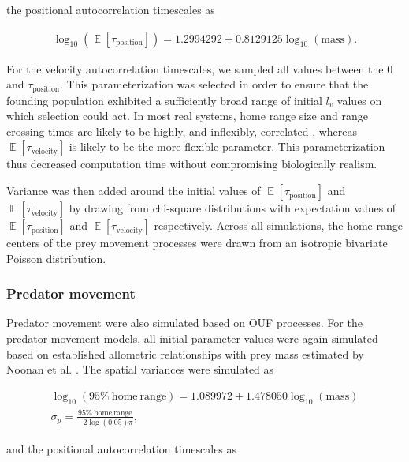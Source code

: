 \documentclass[12pt]{article}
\DeclareMathOperator{\E}{\mathbb{E}}
\begin{document}
the positional autocorrelation timescales as

\begin{gather}
\log_{10}(\E[\tau_\mathrm{position}]) = 1.2994292 + 0.8129125 \log_{10}(\mathrm{mass}).
\end{gather}

For the velocity autocorrelation timescales, we sampled all values between the 0 and $\tau_\mathrm{position}$. This parameterization was selected in order to ensure that the founding population exhibited a sufficiently broad range of initial $l_v$ values on which selection could act. In most real systems, home range size and range crossing times are likely to be highly, and inflexibly, correlated \cite{Noonan:2020}, whereas $\E[\tau_\mathrm{velocity}]$ is likely to be the more flexible parameter. This parameterization thus decreased computation time without compromising biologically realism.


Variance was then added around the initial values of $\E[\tau_\mathrm{position}]$ and $\E[\tau_\mathrm{velocity}]$ by drawing from chi-square distributions with expectation values of $\E[\tau_\mathrm{position}]$ and $\E[\tau_\mathrm{velocity}]$ respectively. Across all simulations, the home range centers of the prey movement processes were drawn from an isotropic bivariate Poisson distribution.

\subsubsection*{Predator movement}

Predator movement were also simulated based on OUF processes. For the predator movement models, all initial parameter values were again simulated based on established allometric relationships with prey mass estimated by Noonan et al. \cite{Noonan:2020}. The spatial variances were simulated as

\begin{gather}
\log_{10}(\mathrm{95\%~home~range}) = 1.089972 + 1.478050 \log_{10}(\mathrm{mass}) \\
\sigma_p = \frac{\mathrm{95\%~home~range}}{-2 \log(0.05)  \pi},
\end{gather}

and the positional autocorrelation timescales as
\end{document}
